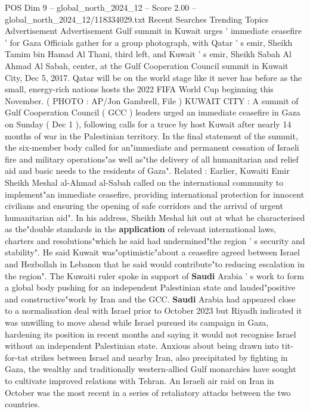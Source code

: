 \begin{textsample}{POS Dim 9 – global\_north\_2024\_12 – Score 2.00 – global\_north\_2024\_12/118334029.txt}  \label{ex:f9_pos_325}
Recent Searches Trending Topics Advertisement Advertisement Gulf summit in Kuwait urges ' immediate ceasefire ' for Gaza Officials gather for a group photograph, with Qatar ' s emir, Sheikh Tamim bin Hamad Al Thani, third left, and Kuwait ' s emir, Sheikh Sabah Al Ahmad Al Sabah, center, at the Gulf Cooperation Council summit in Kuwait City, Dec 5, 2017.
Qatar will be on the world stage like it never has before as the small, energy-rich nations hosts the 2022 FIFA World Cup beginning this November. ( PHOTO : AP/Jon Gambrell, File ) KUWAIT CITY : A summit of Gulf Cooperation Council ( GCC ) leaders urged an immediate ceasefire in Gaza on Sunday ( Dec 1 ), following calls for a truce by host Kuwait after nearly 14 months of war in the Palestinian territory.
In the final statement of the summit, the six-member body called for an"immediate and permanent cessation of Israeli fire and military operations"as well as"the delivery of all humanitarian and relief aid and basic needs to the residents of Gaza".
Related : Earlier, Kuwaiti Emir Sheikh Meshal al-Ahmad al-Sabah called on the international community to implement"an immediate ceasefire, providing international protection for innocent civilians and ensuring the opening of safe corridors and the arrival of urgent humanitarian aid".
In his address, Sheikh Meshal hit out at what he characterised as the"double standards in the \textbf{application} of relevant international laws, charters and resolutions"which he said had undermined"the region ' s security and stability".
He said Kuwait was"optimistic"about a ceasefire agreed between Israel and Hezbollah in Lebanon that he said would contribute"to reducing escalation in the region".
The Kuwaiti ruler spoke in support of \textbf{Saudi} Arabia ' s work to form a global body pushing for an independent Palestinian state and lauded"positive and constructive"work by Iran and the GCC. \textbf{Saudi} Arabia had appeared close to a normalisation deal with Israel prior to October 2023 but Riyadh indicated it was unwilling to move ahead while Israel pursued its campaign in Gaza, hardening its position in recent months and saying it would not recognise Israel without an independent Palestinian state.
Anxious about being drawn into tit-for-tat strikes between Israel and nearby Iran, also precipitated by fighting in Gaza, the wealthy and traditionally western-allied Gulf monarchies have sought to cultivate improved relations with Tehran.
An Israeli air raid on Iran in October was the most recent in a series of retaliatory attacks between the two countries.

\end{textsample}
